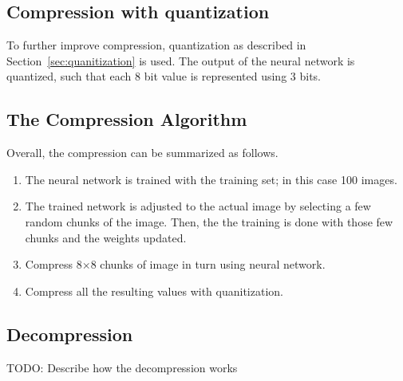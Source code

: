 \subsection{Compression with quantization}
To further improve compression, quantization as described in Section~\ref{sec:quanitization} is used. The output of the neural network is quantized, such that each 8 bit value is represented using 3 bits.  

\subsection{The Compression Algorithm}
\label{sec:compAlg}

Overall, the compression can be summarized as follows.

\begin{enumerate}
\item The neural network is trained with the training set; in this case 100 images.
\item The trained network is adjusted to the actual image by selecting a few random chunks of the image. Then, the the training is done with those few chunks and the weights updated. 
\item Compress 8$\times$8 chunks of image in turn using neural network.
\item Compress all the resulting values with quanitization.

\end{enumerate}

\subsection{Decompression}
\label{sec:decompAlg}
TODO: Describe how the decompression works
